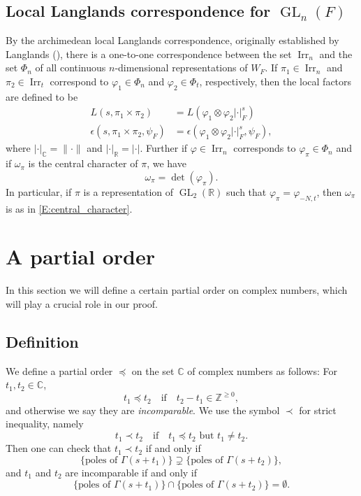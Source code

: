 \documentclass[11pt]{amsart}
\theoremstyle{plain}
\theoremstyle{definition}
\numberwithin{equation}{section}
\newcommand{\C}{\mathbb C}
\newcommand{\Z}{\mathbb{Z}}
\newcommand{\R}{\mathbb{R}}
\newcommand{\Irr}{\operatorname{Irr}}
\newcommand{\GL}{\operatorname{GL}}
\begin{document}
\subsection{Local Langlands correspondence for $\GL_n(F)$}
By the archimedean local Langlands correspondence, originally
established by Langlands (\cite{Langlands}), there is a one-to-one
correspondence between the set $\Irr_n$ and the set $\Phi_n$ of all continuous
$n$-dimensional representations of $W_F$. If $\pi_1\in\Irr_n$ and
$\pi_2\in\Irr_t$ correspond to $\varphi_1\in\Phi_n$ and $\varphi_2\in\Phi_t$,
respectively, then the local factors are defined to be
\begin{align*}
L(s,\pi_1\times\pi_2)&=L(\varphi_1\otimes\varphi_2|\cdot|_F^s)\\
\epsilon(s,\pi_1\times\pi_2,\psi_F)&=
\epsilon(\varphi_1\otimes\varphi_2|\cdot|_F^s,\psi_F),
\end{align*}
where $|\cdot|_{\C}=\|\cdot\|$ and $|\cdot|_{\R}=|\cdot|$. Further if
$\varphi\in\Irr_n$ corresponds to $\varphi_\pi\in\Phi_n$ and if $\omega_\pi$
is the central character of $\pi$, we have
\[
\omega_\pi=\det(\varphi_\pi).
\]
In particular, if $\pi$ is a representation of $\GL_2(\R)$ such that
$\varphi_\pi=\varphi_{-N,t}$, then $\omega_\pi$ is as in \eqref{E:central_character}.


\section{A partial order}


In this section we will define a certain partial order on complex numbers,
which will play a crucial role in our proof. 

\subsection{Definition}
We define a partial order $\preceq$ on the set $\C$ of
complex numbers as follows: For $t_1,t_2\in\C$, 
\[
t_1\preceq t_2\quad\text{if}\quad t_2-t_1\in\Z^{\geq 0},
\]
and otherwise we say they are \emph{incomparable}. We use the symbol $\prec$ for
strict inequality, namely
\[
t_1\prec t_2\quad\text{if}\quad t_1\preceq t_2\text{ but } t_1\neq t_2.
\]
Then one can check that $t_1\prec t_2$ if
and only if
\begin{equation*}
\{\text{poles of $\Gamma(s+t_1)$}\}\supsetneq \{\text{poles of $\Gamma(s+t_2)$}\},
\end{equation*}
and $t_1$ and $t_2$ are incomparable if and only if
\begin{equation*}
\{\text{poles of $\Gamma(s+t_1)$}\}\cap \{\text{poles of $\Gamma(s+t_2)$}\}=\emptyset.
\end{equation*}
\end{document}
